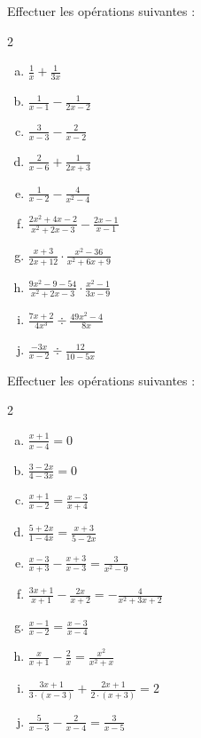 \documentclass[twoside, a4paper, 12pt, openright, fullpage]{book}
\begin{document}
\begin{exercice}\label{fraction6}
Effectuer les opérations suivantes :
\begin{multicols}{2}
\begin{enumerate}[a)]
    \item $\displaystyle \frac{1}{x}+\frac{1}{3x}$
    \item $\displaystyle \frac{1}{x-1}-\frac{1}{2x-2}$
    \item $\displaystyle \frac{3}{x-3}-\frac{2}{x-2}$
    \item $\displaystyle \frac{2}{x-6}+\frac{1}{2x+3}$
    \item $\displaystyle \frac{1}{x-2}-\frac{4}{x^2-4}$
    \item $\displaystyle \frac{2x^2+4x-2}{x^2+2x-3}-\frac{2x-1}{x-1}$
    \item $\displaystyle \frac{x+3}{2x+12}\cdot \frac{x^2-36}{x^2+6x+9}$
    \item $\displaystyle \frac{9x^2-9-54}{x^2+2x-3}\cdot \frac{x^2-1}{3x-9}$
    \item $\displaystyle \frac{7x+2}{4x^3}\div \frac{49x^2-4}{8x}$
    \item $\displaystyle \frac{-3x}{x-2}\div \frac{12}{10-5x}$
    \end{enumerate}
\end{multicols}
\end{exercice}

\begin{exercice}\label{fraction7}
Effectuer les opérations suivantes :
\begin{multicols}{2}
\begin{enumerate}[a)]
    \item $\displaystyle \frac{x+1}{x-4}=0$
    \item $\displaystyle \frac{3-2x}{4-3x}=0$
    \item $\displaystyle \frac{x+1}{x-2}=\frac{x-3}{x+4}$
    \item $\displaystyle \frac{5+2x}{1-4x}= \frac{x+3}{5-2x}$
    \item $\displaystyle \frac{x-3}{x+3}-\frac{x+3}{x-3}= \frac{3}{x^2-9}$
    \item $\displaystyle \frac{3x+1}{x+1}-\frac{2x}{x+2}= -\frac{4}{x^2+3x+2}$
    \item $\displaystyle \frac{x-1}{x-2}=\frac{x-3}{x-4}$
    \item $\displaystyle \frac{x}{x+1}-\frac{2}{x}= \frac{x^2}{x^2 + x}$
    \item $\displaystyle \frac{3x+1}{3\cdot (x-3)}+ \frac{2x+1}{2\cdot (x+3)} = 2$
    \item $\displaystyle \frac{5}{x-3}-\frac{2}{x-4}= \frac{3}{x-5}$
    \end{enumerate}
\end{multicols}
\end{exercice}
\end{document}
